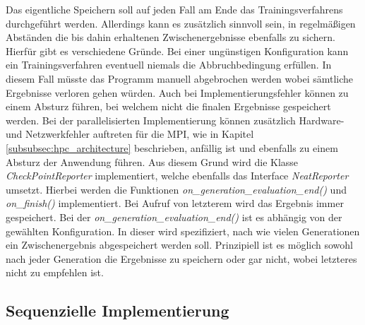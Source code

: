 Das eigentliche Speichern soll auf jeden Fall am Ende das Trainingsverfahrens durchgeführt werden. Allerdings kann es zusätzlich sinnvoll sein, in regelmäßigen Abständen die bis dahin erhaltenen Zwischenergebnisse ebenfalls zu sichern. Hierfür gibt es verschiedene Gründe. Bei einer ungünstigen Konfiguration kann ein Trainingsverfahren eventuell niemals die Abbruchbedingung erfüllen. In diesem Fall müsste das Programm manuell abgebrochen werden wobei sämtliche Ergebnisse verloren gehen würden. Auch bei Implementierungsfehler können zu einem Absturz führen, bei welchem nicht die finalen Ergebnisse gespeichert werden. Bei der parallelisierten Implementierung können zusätzlich Hardware- und Netzwerkfehler auftreten für die \ac{MPI}, wie in Kapitel \ref{subsubsec:hpc_architecture} beschrieben, anfällig ist und ebenfalls zu einem Absturz der Anwendung führen. Aus diesem Grund wird die Klasse \emph{CheckPointReporter} implementiert, welche ebenfalls das Interface \emph{NeatReporter} umsetzt. Hierbei werden die Funktionen \emph{on\_generation\_evaluation\_end()} und \emph{on\_finish()} implementiert. Bei Aufruf von letzterem wird das Ergebnis immer gespeichert. Bei der \emph{on\_generation\_evaluation\_end()} ist es abhängig von der gewählten Konfiguration. In dieser wird spezifiziert, nach wie vielen Generationen ein Zwischenergebnis abgespeichert werden soll. Prinzipiell ist es möglich sowohl nach jeder Generation die Ergebnisse zu speichern oder gar nicht, wobei letzteres nicht zu empfehlen ist.

\subsection{Sequenzielle Implementierung}


